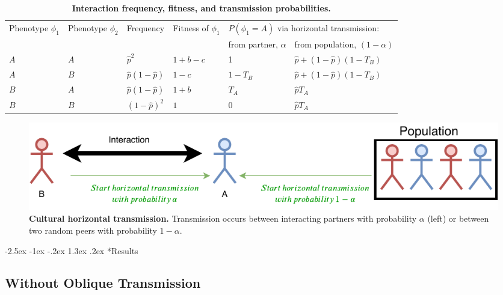 \documentclass[12pt]{extarticle}
\makeatletter
\renewcommand\section{\@startsection {section}{1}{\z@}%
     {-2.5ex \@plus -1ex \@minus -.2ex}%
     {1.3ex \@plus.2ex}%
    {\Large\bfseries}}
\makeatother
\begin{document}
\begin{table}[]
\begin{tabular}{@{}llllll@{}}
\toprule
\multirow{2}{*}{Phenotype $\phi_1$} &
  \multirow{2}{*}{Phenotype $\phi_2$} &
  \multirow{2}{*}{Frequency} &
  \multirow{2}{*}{Fitness of $\phi_1$} &
  \multicolumn{2}{l}{$P(\phi_1=A)$ via horizontal transmission:} \\ \cmidrule(l){5-6} 
    &     &                      &         & from partner, $\alpha$ & from population, $(1-\alpha)$ \\ \cmidrule(r){1-6}
$A$ & $A$ & $\hat{p}^2$          & $1+b-c$ & 1                      & $\hat{p}+(1-\hat{p})(1-T_B)$  \\
$A$ & $B$ & $\hat{p}(1-\hat{p})$ & $1-c$   & $1-T_B$                & $\hat{p}+(1-\hat{p})(1-T_B)$  \\
$B$ & $A$ & $\hat{p}(1-\hat{p})$ & $1+b$   & $T_A$                  & $\hat{p} T_A$                 \\
$B$ & $B$ & $(1-\hat{p})^2$      & $1$     & $0$                    & $\hat{p} T_A$                 \\ \bottomrule
\end{tabular}
\caption{\textbf{Interaction frequency, fitness, and transmission probabilities.}}
\label{table:interactions}
\end{table}

\begin{figure}[b]
  \centering
  \includegraphics[scale=1]{figure1.pdf}
  \caption{\textbf{Cultural horizontal transmission.} Transmission occurs between interacting partners with probability $\alpha$ (left) or between two random peers with probability $1-\alpha$.}
  \label{fig:horizontal}
\end{figure}


\section*{Results}

\subsection*{Without Oblique Transmission}
\end{document}
